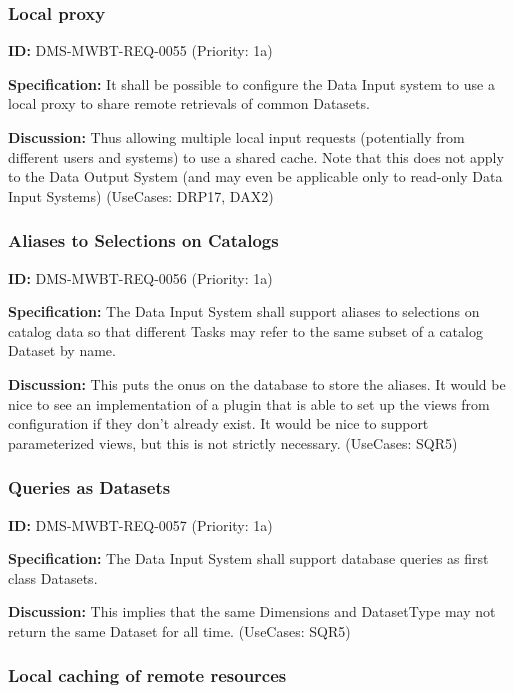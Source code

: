\documentclass[SE,toc,lsstdraft]{lsstdoc}
\begin{document}
\subsubsection{Local proxy}

\label{DMS-MWBT-REQ-0055}
\textbf{ID:} DMS-MWBT-REQ-0055 (Priority: 1a)

\textbf{Specification:}
It shall be possible to configure the Data Input system to use a local proxy to share remote retrievals of common Datasets.

\textbf{Discussion:}
Thus allowing multiple local input requests (potentially from different users and systems) to use a shared cache. Note that this does not apply to the Data Output System (and may even be applicable only to read-only Data Input Systems) (UseCases: DRP17, DAX2)

\subsubsection{Aliases to Selections on Catalogs}

\label{DMS-MWBT-REQ-0056}
\textbf{ID:} DMS-MWBT-REQ-0056 (Priority: 1a)

\textbf{Specification:}
The Data Input System shall support aliases to selections on catalog data so that different Tasks may refer to the same subset of a catalog Dataset by name.

\textbf{Discussion:}
This puts the onus on the database to store the aliases. It would be nice to see an implementation of a plugin that is able to set up the views from configuration if they don't already exist. It would be nice to support parameterized views, but this is not strictly necessary. (UseCases: SQR5)

\subsubsection{Queries as Datasets}

\label{DMS-MWBT-REQ-0057}
\textbf{ID:} DMS-MWBT-REQ-0057 (Priority: 1a)

\textbf{Specification:}
The Data Input System shall support database queries as first class Datasets.

\textbf{Discussion:}
This implies that the same Dimensions and DatasetType may not return the same Dataset for all time. (UseCases: SQR5)

\subsubsection{Local caching of remote resources}
\end{document}
